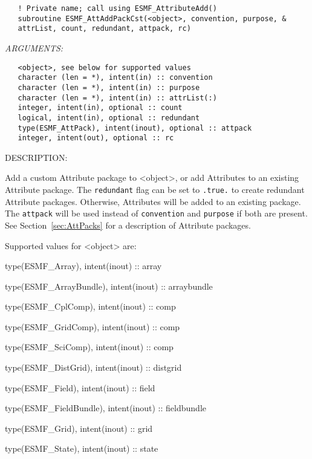   
\begin{verbatim}   ! Private name; call using ESMF_AttributeAdd()
   subroutine ESMF_AttAddPackCst(<object>, convention, purpose, &
   attrList, count, redundant, attpack, rc)\end{verbatim}{\em ARGUMENTS:}
\begin{verbatim}   <object>, see below for supported values
   character (len = *), intent(in) :: convention
   character (len = *), intent(in) :: purpose
   character (len = *), intent(in) :: attrList(:)
   integer, intent(in), optional :: count
   logical, intent(in), optional :: redundant
   type(ESMF_AttPack), intent(inout), optional :: attpack
   integer, intent(out), optional :: rc\end{verbatim}
{\sf DESCRIPTION:\\ }


   Add a custom Attribute package to <object>, or add
   Attributes to an existing Attribute package. The {\tt redundant} flag can
   be set to {\tt .true.} to create redundant Attribute packages. Otherwise,
   Attributes will be added to an existing package. The {\tt attpack} will be
   used instead of {\tt convention} and {\tt purpose} if both are present.
   See Section~\ref{sec:AttPacks} for a description of Attribute packages.
  
   Supported values for <object> are:
   \begin{description}
   \item type(ESMF\_Array), intent(inout) :: array
   \item type(ESMF\_ArrayBundle), intent(inout) :: arraybundle
   \item type(ESMF\_CplComp), intent(inout) :: comp
   \item type(ESMF\_GridComp), intent(inout) :: comp
   \item type(ESMF\_SciComp), intent(inout) :: comp
   \item type(ESMF\_DistGrid), intent(inout) :: distgrid
   \item type(ESMF\_Field), intent(inout) :: field
   \item type(ESMF\_FieldBundle), intent(inout) :: fieldbundle
   \item type(ESMF\_Grid), intent(inout) :: grid
   \item type(ESMF\_State), intent(inout) :: state
   \end{description}
  
